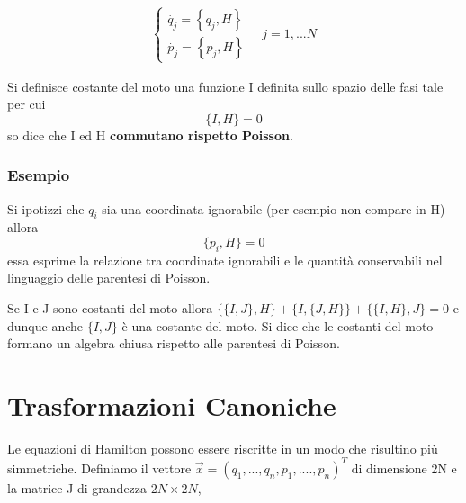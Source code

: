 \begin{align}
	\left\{\begin{array}{l}
		\dot{q_j}=\left\{q_j, H\right\} \\
		\dot{p_j}=\left\{p_j, H\right\}
	\end{array}\right.
	\quad j=1,...N
\end{align}
\vspace{0.1in}
\begin{definition}
	Si definisce costante del moto una funzione I definita sullo spazio delle fasi tale per cui
	\begin{equation}
		\Big \{ I,H \Big \}=0
	\end{equation}
	so dice che I ed H \textbf{commutano rispetto Poisson}. 
\end{definition}

\subsubsection{Esempio}

Si ipotizzi che $q_i$ sia una coordinata ignorabile (per esempio non compare in H) allora 
\begin{equation*}
	\Big \{ p_i,H \Big \} = 0
\end{equation*}
essa esprime la relazione tra coordinate ignorabili e le quantit\`{a} conservabili nel linguaggio delle parentesi di Poisson. 
\newline
\begin{remark}
	Se I e J sono costanti del moto allora $\{\{I,J\},H\} + \{I,\{J,H\}\} + \{\{I,H\},J\} = 0$ e dunque anche $\{I,J\}$ \`{e} una costante del moto. Si dice che le costanti del moto formano un algebra chiusa rispetto alle parentesi di Poisson.
\end{remark}

\section{Trasformazioni Canoniche}

Le equazioni di Hamilton possono essere riscritte in un modo che risultino pi\`{u} simmetriche. Definiamo il vettore $\vec{x} = (q_1,...,q_n,p_1,....,p_n)^T$ di dimensione 2N e la matrice J di grandezza $2N \times 2N$,

